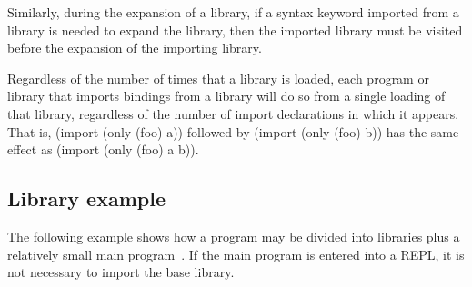 Similarly, during the expansion of a library, if a syntax keyword
imported from a library is needed to expand the library, then the
imported library must be visited before the expansion of the importing
library.

Regardless of the number of times that a library is loaded, each
program or library that imports bindings from a library will do so from a
single loading of that library, regardless of the number of import
declarations in which it appears.
That is, {\cf (import (only (foo) a))} followed by {\cf (import (only (foo) b))}
has the same effect as {\cf (import (only (foo) a b))}.

\subsection{Library example}
The following example shows
how a program may be divided into libraries plus a relatively small
main program~\cite{life}.
If the main program is entered into a REPL, it is not necessary to import
the base library.

